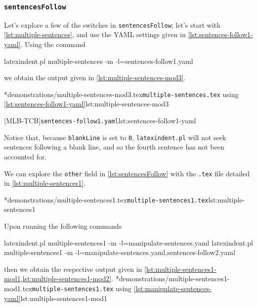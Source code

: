 \subsubsection{\texttt{sentencesFollow}}
	Let's explore a few of the switches in \texttt{sentencesFollow}; let's start with \vref{lst:multiple-sentences}, and use the YAML settings given in \cref{lst:sentences-follow1-yaml}.
	Using the command \begin{commandshell}
latexindent.pl multiple-sentences -m -l=sentences-follow1.yaml
\end{commandshell} we obtain the output given in \cref{lst:multiple-sentences-mod3}.

	\begin{minipage}{.5\linewidth}
		\cmhlistingsfromfile*[showspaces=false]*{demonstrations/multiple-sentences-mod3.tex}{\texttt{multiple-sentences.tex} using \cref{lst:sentences-follow1-yaml}}{lst:multiple-sentences-mod3}
	\end{minipage}
	\hfill
	\begin{minipage}{.5\linewidth}
		[MLB-TCB]{\texttt{sentences-follow1.yaml}}{lst:sentences-follow1-yaml}
	\end{minipage}

	Notice that, because \texttt{blankLine} is set to \texttt{0}, \texttt{latexindent.pl} will not seek sentences following a blank line, and so the fourth sentence has not been accounted for.

	We can explore the \texttt{other} field in \cref{lst:sentencesFollow} with the \texttt{.tex} file detailed in \cref{lst:multiple-sentences1}.

	\cmhlistingsfromfile*[showspaces=false]*{demonstrations/multiple-sentences1.tex}{\texttt{multiple-sentences1.tex}}{lst:multiple-sentences1}

	Upon running the following commands \begin{widepage} \begin{commandshell}
latexindent.pl multiple-sentences1 -m -l=manipulate-sentences.yaml
latexindent.pl multiple-sentences1 -m -l=manipulate-sentences.yaml,sentences-follow2.yaml
	\end{commandshell} \end{widepage} then we obtain the respective output given in \cref{lst:multiple-sentences1-mod1,lst:multiple-sentences1-mod2}.
	\cmhlistingsfromfile*[showspaces=false]*{demonstrations/multiple-sentences1-mod1.tex}{\texttt{multiple-sentences1.tex} using \vref{lst:manipulate-sentences-yaml}}{lst:multiple-sentences1-mod1}


